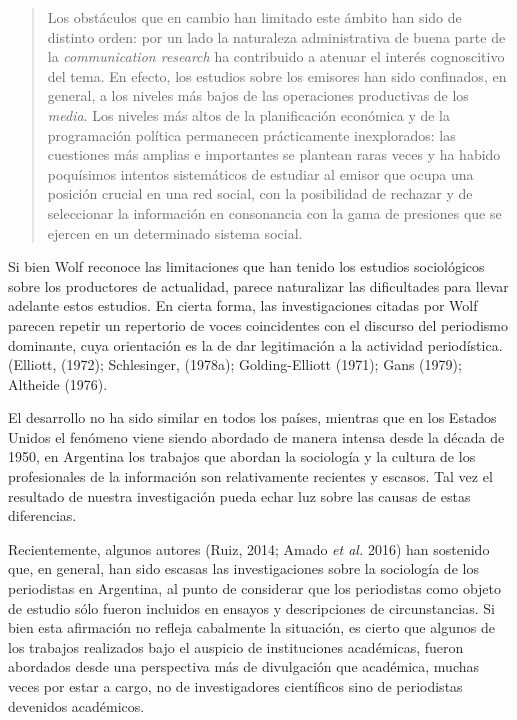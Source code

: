 {\begin{quote}
Los obstáculos que en cambio han limitado este ámbito han sido de distinto orden: por un lado la naturaleza administrativa de buena parte de la \emph{communication research} ha contribuido a atenuar el interés cognoscitivo del tema. En efecto, los estudios sobre los emisores han sido confinados, en general, a los niveles más bajos de las operaciones productivas de los \emph{media}. Los niveles más altos de la planificación económica y de la programación política permanecen prácticamente inexplorados: las cuestiones más amplias e importantes se plantean raras veces y ha habido poquísimos intentos sistemáticos de estudiar al emisor que ocupa una posición crucial en una red social, con la posibilidad de rechazar y de seleccionar la información en consonancia con la gama de presiones que se ejercen en un determinado sistema social.
\end{quote}

Si bien Wolf reconoce las limitaciones que han tenido los estudios sociológicos sobre los productores de actualidad, parece naturalizar las dificultades para llevar adelante estos estudios. En cierta forma, las investigaciones citadas por Wolf parecen repetir un repertorio de voces coincidentes con el discurso del periodismo dominante, cuya orientación es la de dar legitimación a la actividad periodística. (Elliott, (1972); Schlesinger, (1978a); Golding-Elliott (1971); Gans (1979); Altheide (1976).

El desarrollo no ha sido similar en todos los países, mientras que en los Estados Unidos el fenómeno viene siendo abordado de manera intensa desde la década de 1950, en Argentina los trabajos que abordan la sociología y la cultura de los profesionales de la información son relativamente recientes y escasos. Tal vez el resultado de nuestra investigación pueda echar luz sobre las causas de estas diferencias.

Recientemente, algunos autores (Ruiz, 2014; Amado \emph{et al.} 2016) han sostenido que, en general, han sido escasas las investigaciones sobre la sociología de los periodistas en Argentina, al punto de considerar que los periodistas como objeto de estudio sólo fueron incluidos en ensayos y descripciones de circunstancias. Si bien esta afirmación no refleja cabalmente la situación, es cierto que algunos de los trabajos realizados bajo el auspicio de instituciones académicas, fueron abordados desde una perspectiva más de divulgación que académica, muchas veces por estar a cargo, no de investigadores científicos sino de periodistas devenidos académicos.

}
